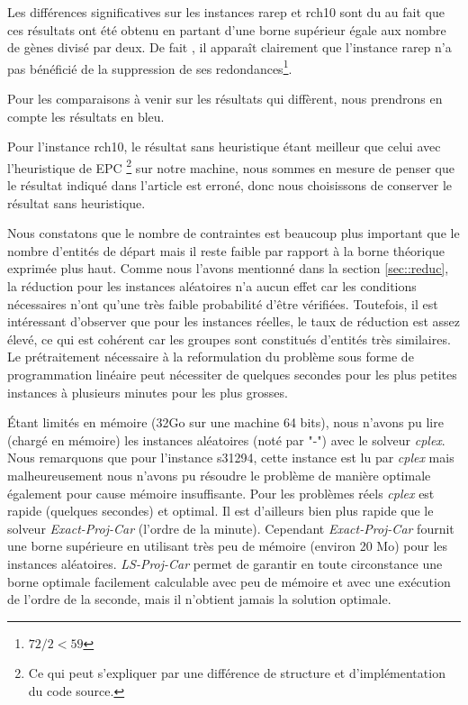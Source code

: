 \documentclass[a4paper,10pt]{article}
\begin{document}
Les différences significatives sur les instances rarep et rch10 sont du au fait que ces résultats ont été obtenu en partant d'une borne supérieur égale aux nombre de gènes divisé par deux. De fait , il apparaît clairement que l'instance rarep n'a pas bénéficié de la suppression de ses redondances\footnote{$72/2<59$}.

Pour les comparaisons à venir sur les résultats qui diffèrent, nous prendrons en compte les résultats en bleu.

Pour l'instance rch10, le résultat sans heuristique étant meilleur que celui avec l'heuristique de EPC \footnote{Ce qui peut s'expliquer par une différence de structure et d'implémentation du code source.} sur notre machine, nous sommes en mesure de penser que le résultat indiqué dans l'article est erroné, donc nous choisissons de conserver le résultat sans heuristique.


Nous constatons que le nombre de contraintes est beaucoup plus important que le
nombre d'entités de départ mais il reste faible par rapport à la borne théorique
exprimée plus haut. Comme nous l'avons mentionné dans la section \ref{sec::reduc}, la réduction pour les instances aléatoires n'a aucun effet car les conditions nécessaires n'ont qu'une très faible probabilité d'être vérifiées. Toutefois, il est intéressant d'observer que pour les instances réelles, le taux de réduction est assez élevé, ce qui est cohérent car les groupes sont constitués d'entités très similaires.
Le prétraitement nécessaire à la reformulation du problème sous forme de programmation linéaire peut nécessiter de quelques secondes pour les plus petites instances à plusieurs minutes pour les plus grosses.

\'Etant limités en mémoire (32Go sur une machine 64 bits), nous n'avons pu
lire (chargé en mémoire) les instances aléatoires (noté par "-") avec le solveur \emph{cplex}. Nous remarquons que pour l'instance s31294, cette instance est lu par \emph{cplex} mais malheureusement nous n'avons pu résoudre le problème de manière optimale également pour cause mémoire insuffisante.
Pour les problèmes réels \emph{cplex}
est  rapide (quelques secondes) et optimal. Il est d'ailleurs bien plus
rapide que le solveur \emph{Exact-Proj-Car} (l'ordre de la minute).
Cependant \emph{Exact-Proj-Car} fournit une borne supérieure en utilisant très peu de
mémoire (environ 20 Mo) pour les instances aléatoires. \emph{LS-Proj-Car} permet de garantir en toute circonstance une borne optimale facilement calculable avec peu de mémoire et avec une exécution de l'ordre de la seconde, mais il n'obtient jamais la solution optimale.
\end{document}
